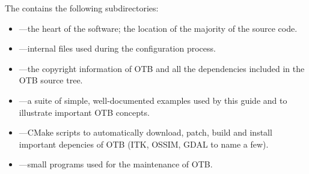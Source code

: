 The  contains the following subdirectories:
\begin{itemize}
        \item {}---the heart of the software; the location
        of the majority of the source code.
        \item {}---internal files used during the
        configuration process.
        \item {}---the copyright information of OTB
        and all the dependencies included in the OTB source tree.
        \item {}---a suite of simple, well-documented
        examples used by this guide and to illustrate important
        OTB concepts.
        \item {}---CMake scripts to automatically download, patch, build and install important
        depencies of OTB (ITK, OSSIM, GDAL to name a few).
        \item {}---small programs used for the maintenance of OTB.
\end{itemize}


